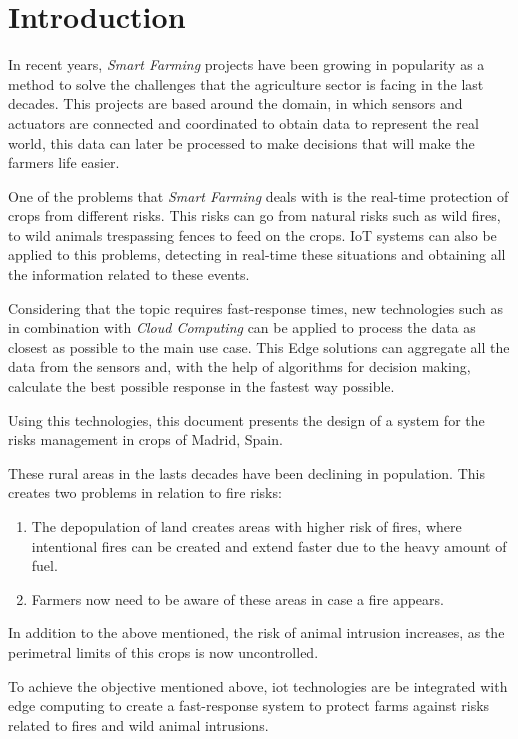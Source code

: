 \section{Introduction}

In recent years, \textit{Smart Farming} projects have been growing in popularity as a method to solve the challenges that the agriculture sector is facing in the last decades. 
This projects are based around the  domain, in which sensors and actuators are connected and coordinated to obtain data to represent the real world, this data can 
later be processed to make decisions that will make the farmers life easier.

One of the problems that \textit{Smart Farming} deals with is the real-time protection of crops from different risks. This risks can go from natural 
risks such as wild fires, to wild animals trespassing fences to feed on the crops. IoT systems can also be applied to this problems, detecting in real-time 
these situations and obtaining all the information related to these events. 

Considering that the topic requires fast-response times, new technologies such as  in combination with \textit{Cloud Computing} can be applied to 
process the data as closest as possible to the main use case. This Edge solutions can aggregate all the data from the sensors and, with the help of 
algorithms for decision making, calculate the best possible response in the fastest way possible.


Using this technologies, this document presents the design of a system for the risks management in crops of Madrid, Spain. 

These rural areas in the lasts decades have been declining in population. This creates two problems in relation to fire risks:
\begin{enumerate}
    \item The depopulation of land creates areas with higher risk of fires\cite{Yanosolo}, where intentional fires can be created and extend faster due to the heavy amount of fuel.
    \item Farmers now need to be aware of these areas in case a fire appears.
\end{enumerate}

In addition to the above mentioned, the risk of animal intrusion increases\cite{importanciacazaEspana}, as the perimetral limits of this crops is now uncontrolled.

To achieve the objective mentioned above, \acrshort{iot} technologies are be integrated with edge computing to create a fast-response system to protect farms against risks related to fires and wild animal intrusions.
